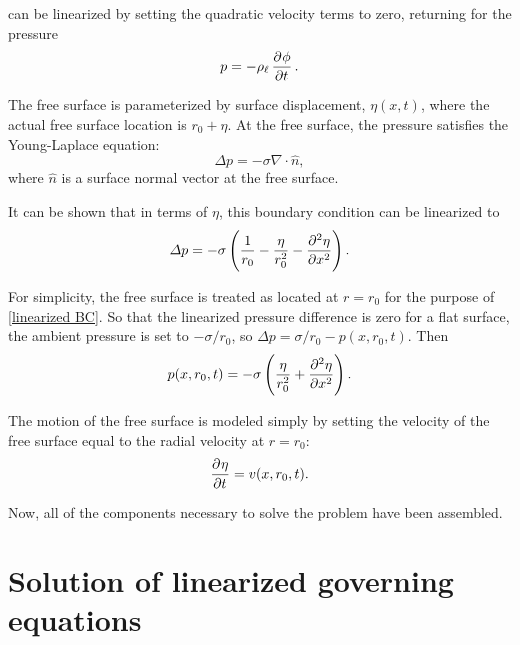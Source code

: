  can be linearized by setting the quadratic velocity terms to zero, returning for the pressure
\begin{equation}
   p = -\rhol \dpd{\phi}{t}. \label{eqn:unsteady Bernoulli linearized}
\end{equation}

The free surface is parameterized by surface displacement, $\eta(x, t)$, where the actual free surface location is $r_0 + \eta$. At the free surface, the pressure satisfies the Young-Laplace equation:
\begin{equation}
   \Delta p = -\sigma \nabla \cdot \hat{n}, \label{eqn:exact BC}
\end{equation}
where $\hat{n}$ is a surface normal vector at the free surface.

It can be shown that in terms of $\eta$, this boundary condition can be linearized to~\citep[p.~975]{berger_initial-value_1988}
\begin{equation}
   \Delta p = -\sigma \left(\frac{1}{r_0} - \frac{\eta}{r_0^2} - \dpd[2]{\eta}{x}\right). \label{eqn:linearized BC}
\end{equation}

For simplicity, the free surface is treated as located at $r = r_0$ for the purpose of \eqref{linearized BC}. So that the linearized pressure difference is zero for a flat surface, the ambient pressure is set to $-\sigma/r_0$, so $\Delta p = \sigma/r_0 - p(x, r_0, t)$. Then
\begin{equation}
   p(x, r_0, t) = -\sigma \left(\frac{\eta}{r_0^2} + \dpd[2]{\eta}{x}\right). \label{eqn:linearized BC simplified}
\end{equation}

The motion of the free surface is modeled simply by setting the velocity of the free surface equal to the radial velocity at $r = r_0$:
\begin{equation}
   \dpd{\eta}{t} = v(x, r_0, t). \label{eqn:surface displacement evolution}
\end{equation}

Now, all of the components necessary to solve the problem have been assembled.

\section{Solution of linearized governing equations}

